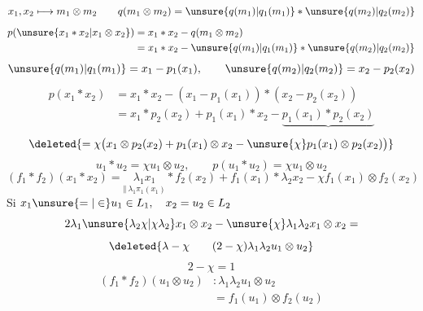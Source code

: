 \[
x_1,x_2\longmapsto m_1\otimes m_2
\qquad q(m_1\otimes m_2)=\unsure{q(m_1)|q_1(m_1)}*\unsure{q(m_2)|q_2(m_2)}
\]
\[
\begin{aligned}
p(\unsure{x_1*x_2|x_1\otimes x_2})
&=x_1*x_2-q(m_1\otimes m_2)\\
&=x_1*x_2-\unsure{q(m_1)|q_1(m_1)}*\unsure{q(m_2)|q_2(m_2)}
\end{aligned}
\]
\[
\unsure{q(m_1)|q_1(m_1)}=x_1-p_1(x_1),\qquad
\unsure{q(m_2)|q_2(m_2)}=x_2-p_2(x_2)
\]
\[
\begin{aligned}
p(x_1*x_2)&=x_1*x_2-(x_1-p_1(x_1))*(x_2-p_2(x_2))\\
&=x_1*p_2(x_2)+p_1(x_1)*x_2-\underbrace{p_1(x_1)*p_2(x_2)}
\end{aligned}
\]
\[
\deleted{=\chi\bigl(x_1\otimes p_2(x_2)+p_1(x_1)\otimes x_2
-\unsure{\chi}p_1(x_1)\otimes p_2(x_2)\bigr)}
\]
\[
u_1*u_2=\chi u_1\otimes u_2,\qquad
p(u_1*u_2)=\chi u_1\otimes u_2
\]
\[
\boxed{(f_1*f_2)(x_1*x_2)=
\underset{\Vert\ \lambda_1\pi_1(x_1)}{\lambda_1x_1}*f_2(x_2)
+f_1(x_1)*\lambda_2x_2-\chi f_1(x_1)\otimes f_2(x_2)}
\]
Si \(x_1\unsure{=|\in}u_1\in L_1,\quad x_2=u_2\in L_2\)
\[
2\lambda_1\unsure{\lambda_2\chi|\chi\lambda_2}x_1\otimes x_2
-\unsure{\chi}\lambda_1\lambda_2x_1\otimes x_2=
\]
\[
\deleted{\lambda-\chi\qquad(2-\chi)\lambda_1\lambda_2u_1\otimes u_2}
\]
\[
2-\chi=1
\]
\[
\begin{aligned}
(f_1*f_2)(u_1\otimes u_2)&:\lambda_1\lambda_2u_1\otimes u_2\\
&=f_1(u_1)\otimes f_2(u_2)
\end{aligned}
\]
